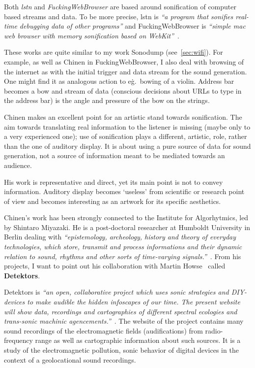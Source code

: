\documentclass[12pt,a4paper,oneside]{report}
\begin{document}
Both \emph{lstn} and \emph{FuckingWebBrowser} are based around sonification of computer based streams and data. To be more precise, lstn is \emph{``a program that sonifies real-time debugging data of other programs''} and FuckingWebBrowser is \emph{``simple mac web browser with memory sonification based on WebKit''}~\cite{Chinen2010, Chinen2010a}.

These works are quite similar to my work Sonodump (see~\ref{sec:wifi}). For example, as well as Chinen in FuckingWebBrowser, I also deal with browsing of the internet as with the initial trigger and data stream for the sound generation. One might find it as analogous action to e\.g.\, bowing of a violin. Address bar becomes a bow and stream of data (conscious decisions about URLs to type in the address bar) is the angle and pressure of the bow on the strings. 

Chinen makes an excellent point for an artistic stand towards sonification. The aim towards translating real information to the listener is missing (maybe only to a very experienced one); use of sonification plays a different, artistic, role, rather than the one of auditory display. It is about using a pure source of data for sound generation, not a source of information meant to be mediated towards an audience.

His work is representative and direct, yet its main point is not to convey information. Auditory display becomes `useless' from scientific or research point of view and becomes interesting as an artwork for its specific aesthetics.

Chinen's work has been strongly connected to the Institute for Algorhytmics, led by Shintaro Miyazaki. He is a post-doctoral researcher at Humboldt University in Berlin dealing with \emph{``epistemology, archeology, history and theory of everyday technologies, which store, transmit and process informations and their dynamic relation to sound, rhythms and other sorts of time-varying signals.''}~\cite{Miyazaki2012}. From his projects, I want to point out his collaboration with Martin Howse~\cite{howse} called \textbf{Detektors}.

Detektors is \emph{``an open, collaborative project which uses sonic strategies and DIY-devices to make audible the hidden infoscapes of our time. The present website will show data, recordings and cartographies of different spectral ecologies and trans-sonic machinic agencements.''}~\cite{detektors}. The website of the project contains many sound recordings of the electromagnetic fields (audifications) from radio-frequency range as well as cartographic information about such sources. It is a study of the electromagnetic pollution, sonic behavior of digital devices in the context of a geolocational sound recordings.
\end{document}
